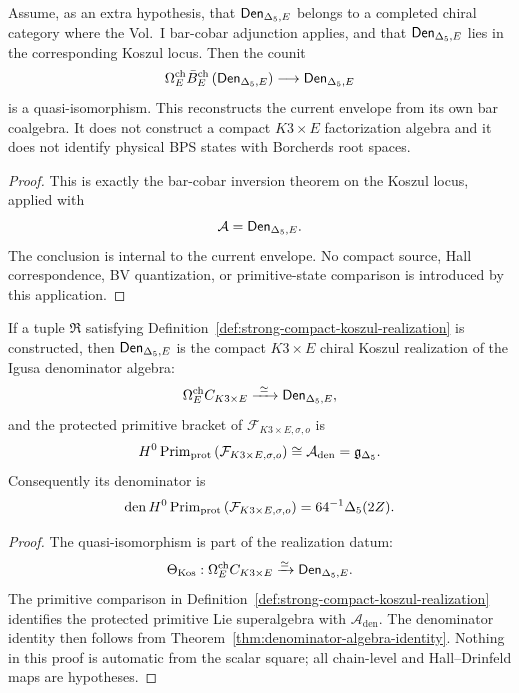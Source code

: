 \begin{proposition}
\label{prop:tautological-bar-cobar-current}
Assume, as an extra hypothesis, that \(\mathsf{Den}_{\Delta_5,E}\) belongs to a
completed chiral category where the Vol.~I bar-cobar adjunction applies,
and that \(\mathsf{Den}_{\Delta_5,E}\) lies in the corresponding Koszul locus.
Then the counit
$$
\Omega^{\mathrm{ch}}_E\bar B_E^{\mathrm{ch}}
\left(\mathsf{Den}_{\Delta_5,E}\right)
\longrightarrow
\mathsf{Den}_{\Delta_5,E}
$$
is a quasi-isomorphism.  This reconstructs the current envelope from its
own bar coalgebra.  It does not construct a compact \(K3\times E\)
factorization algebra and it does not identify physical BPS states with
Borcherds root spaces.
\end{proposition}

\begin{proof}
This is exactly the bar-cobar inversion theorem on the Koszul locus,
applied with
\[
\mathcal A=\mathsf{Den}_{\Delta_5,E}.
\]
The conclusion is internal to the current envelope.  No compact source,
Hall correspondence, BV quantization, or primitive-state comparison is
introduced by this application.
\end{proof}

\begin{theorem}
\label{thm:sharp-conditional-koszul-realization}
If a tuple \(\mathfrak R\) satisfying
Definition~\ref{def:strong-compact-koszul-realization} is constructed,
then \(\mathsf{Den}_{\Delta_5,E}\) is the compact \(K3\times E\) chiral Koszul
realization of the Igusa denominator algebra:
$$
\Omega^{\mathrm{ch}}_E C_{K3\times E}
\xrightarrow{\ \simeq\ }
\mathsf{Den}_{\Delta_5,E},
$$
and the protected primitive bracket of
\(\mathcal F_{K3\times E,\sigma,o}\) is
$$
H^0\operatorname{Prim}_{\mathrm{prot}}
\left(\mathcal F_{K3\times E,\sigma,o}\right)
\cong
\mathcal A_{\mathrm{den}}
=\mathfrak g_{\Delta_5}.
$$
Consequently its denominator is
$$
\operatorname{den}
H^0\operatorname{Prim}_{\mathrm{prot}}
\left(\mathcal F_{K3\times E,\sigma,o}\right)
=64^{-1}\Delta_5(2Z).
$$
\end{theorem}

\begin{proof}
The quasi-isomorphism is part of the realization datum:
\[
\Theta_{\mathrm{Kos}}:
\Omega^{\mathrm{ch}}_E C_{K3\times E}\xrightarrow{\simeq}\mathsf{Den}_{\Delta_5,E}.
\]
The primitive comparison in
Definition~\ref{def:strong-compact-koszul-realization} identifies the
protected primitive Lie superalgebra with
\(\mathcal A_{\mathrm{den}}\).  The denominator identity then follows
from Theorem~\ref{thm:denominator-algebra-identity}.  Nothing in this proof
is automatic from the scalar square; all chain-level and Hall--Drinfeld
maps are hypotheses.
\end{proof}

